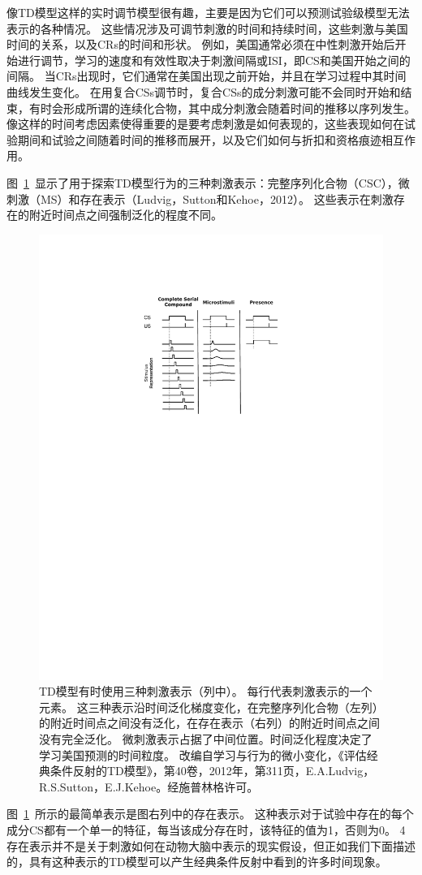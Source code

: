 {像TD模型这样的实时调节模型很有趣，主要是因为它们可以预测试验级模型无法表示的各种情况。
这些情况涉及可调节刺激的时间和持续时间，这些刺激与美国时间的关系，以及CRs的时间和形状。
例如，美国通常必须在中性刺激开始后开始进行调节，学习的速度和有效性取决于刺激间隔或ISI，即CS和美国开始之间的间隔。
当CRs出现时，它们通常在美国出现之前开始，并且在学习过程中其时间曲线发生变化。
在用复合CSs调节时，复合CSs的成分刺激可能不会同时开始和结束，有时会形成所谓的连续化合物，其中成分刺激会随着时间的推移以序列发生。
像这样的时间考虑因素使得重要的是要考虑刺激是如何表现的，这些表现如何在试验期间和试验之间随着时间的推移而展开，以及它们如何与折扣和资格痕迹相互作用。


图~\ref{fig:11_1}~显示了用于探索TD模型行为的三种刺激表示：完整序列化合物（CSC），微刺激（MS）和存在表示（Ludvig，Sutton和Kehoe，2012）。
这些表示在刺激存在的附近时间点之间强制泛化的程度不同。


\begin{figure}[!htb]
	\centering
	\includegraphics[width=0.5\linewidth]{chap11/fig_11_1}
	\caption{TD模型有时使用三种刺激表示（列中）。
		每行代表刺激表示的一个元素。
		这三种表示沿时间泛化梯度变化，在完整序列化合物（左列）的附近时间点之间没有泛化，在存在表示（右列）的附近时间点之间没有完全泛化。
		微刺激表示占据了中间位置。时间泛化程度决定了学习美国预测的时间粒度。
		改编自学习与行为的微小变化，《评估经典条件反射的TD模型》，第40卷，2012年，第311页，E.A.Ludvig，R.S.Sutton，E.J.Kehoe。经施普林格许可。  \label{fig:11_1}}
\end{figure}

图~\ref{fig:11_1}~所示的最简单表示是图右列中的存在表示。
这种表示对于试验中存在的每个成分CS都有一个单一的特征，每当该成分存在时，该特征的值为1，否则为0。
4存在表示并不是关于刺激如何在动物大脑中表示的现实假设，但正如我们下面描述的，具有这种表示的TD模型可以产生经典条件反射中看到的许多时间现象。


}
